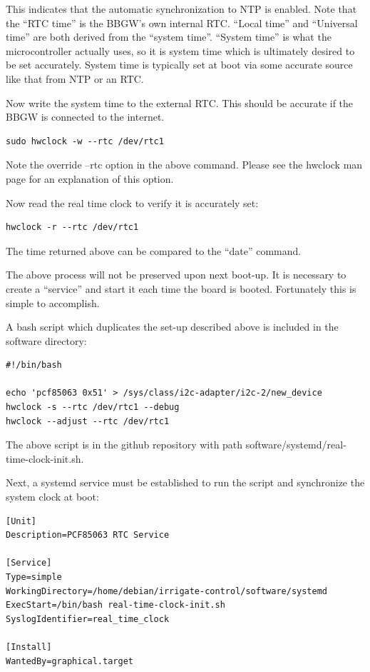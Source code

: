 This indicates that the automatic synchronization to NTP is enabled.
Note that the ``RTC time'' is the BBGW's own internal RTC.  ``Local time'' and ``Universal time'' are both derived from the ``system time''.  ``System time'' is what the microcontroller actually uses, so it is system time which is ultimately desired to be set accurately.  System time is typically set at boot via some accurate source like that from NTP or an RTC.

Now write the system time to the external RTC.  This should be accurate if the BBGW is connected to the internet.

\begin{verbatim}
sudo hwclock -w --rtc /dev/rtc1
\end{verbatim}

Note the override --rtc option in the above command.  Please see the hwclock man page for an explanation of this option.

Now read the real time clock to verify it is accurately set:

\begin{verbatim}
hwclock -r --rtc /dev/rtc1
\end{verbatim}

The time returned above can be compared to the ``date'' command.

The above process will not be preserved upon next boot-up.  It is necessary to create a ``service'' and start it each time the board is booted.  Fortunately this is simple to accomplish.

A bash script which duplicates the set-up described above is included in the software directory:

\begin{verbatim}
#!/bin/bash

echo 'pcf85063 0x51' > /sys/class/i2c-adapter/i2c-2/new_device
hwclock -s --rtc /dev/rtc1 --debug
hwclock --adjust --rtc /dev/rtc1
\end{verbatim}

The above script is in the github repository with path software/systemd/real-time-clock-init.sh.

Next, a systemd service must be established to run the script and synchronize the system clock at boot:

\begin{verbatim}
[Unit]
Description=PCF85063 RTC Service

[Service]
Type=simple
WorkingDirectory=/home/debian/irrigate-control/software/systemd
ExecStart=/bin/bash real-time-clock-init.sh
SyslogIdentifier=real_time_clock

[Install]
WantedBy=graphical.target
\end{verbatim}

